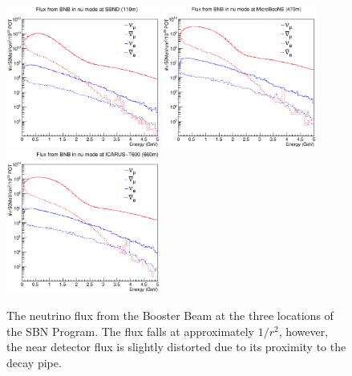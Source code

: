 \begin{figure}[htbp]
  \centering
  \includegraphics[width=0.45\textwidth]{beams_figures/bnb_flux_nu_100m.eps}
  \includegraphics[width=0.45\textwidth]{beams_figures/bnb_flux_nu_470m.eps}
  \includegraphics[width=0.45\textwidth]{beams_figures/bnb_flux_nu_700m.eps}
  \caption[BNB Fluxes]{The neutrino flux from the Booster Beam at the three locations of the SBN Program.  The flux falls at approximately $1/r^2$, however, the near detector flux is slightly distorted due to its proximity to the decay pipe.}
  \label{fig:sbn_flux}
\end{figure}

